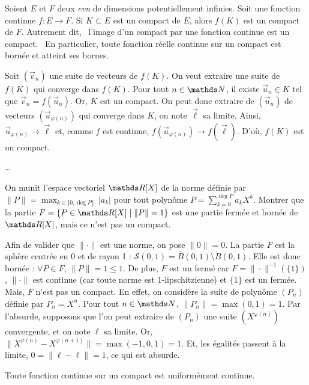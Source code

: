 

\begin{prop}
	Soient $E$ et $F$ deux \textit{evn} de dimensions potentiellement infinies.
	Soit une fonction continue $f : E \to F$. Si $K \subset E$ est un compact de $E$, alors $f(K)$ est un compact de $F$.
	Autrement dit, \guillemotleft~l'image d'un compact par une fonction continue est un compact.~\guillemotright\@
	En particulier, toute fonction réelle continue sur un compact est bornée et atteint ses bornes.
\end{prop}

\begin{prv}
	Soit $(\vec{v}_n)$ une suite de vecteurs de $f(K)$.
	On veut extraire une suite de $f(K)$ qui converge dans $f(K)$.
	Pour tout $n \in \N$, il existe $\vec{u}_n \in K$ tel que $\vec{v}_n = f(\vec{u}_n)$.
	Or, $K$ est un compact.
	On peut donc extraire de $(\vec{u}_n)$ de vecteurs $(\vec{u}_{\varphi(n)})$ qui converge dans $K$, on note $\vec{\ell}$ sa limite.
	Ainsi, $\vec{u}_{\varphi(n)} \to \vec{\ell}$ et, comme $f$ est continue, $f(\vec{u}_{\varphi(n)}) \to f(\vec{\ell})$. D'où, $f(K)$ est un compact.
\end{prv}


\begin{prop}
	\ldots
\end{prop}

\begin{exo}
	\begin{slshape}
		On munit l'espace vectoriel $\R[X]$ de la norme définie par $\|P\| = \max_{k \in \llbracket 0,\deg P \rrbracket}\:|a_k|$\/ pour tout polynôme $P = \sum_{k=0}^{\deg P} a_k X^k$. Montrer que la partie $F = \{P \in \R[X]  \mid \|P\| = 1\}$ est une partie fermée et bornée de $\R[X]$, mais ce n'est pas un compact.
	\end{slshape}

	Afin de valider que $\|\cdot\|$ est une norme, on pose $\|0\| = 0$.
	La partie $F$ est la sphère centrée en $0$ et de rayon 1 : $\mathcal{S}(0, 1) = \bar{B}(0, 1) \setminus \mathring B(0, 1)$.
	Elle est donc bornée : $\forall P \in F$, $\|P\| = 1 \le 1$.
	De plus, $F$ est un fermé car $F = \|\cdot \|^{-1}(\{1\})$, $\|\cdot\|$ est continue (car toute norme est 1-lipschitzienne) et $\{1\}$ est un fermée.
	Mais, $F$ n'est pas un compact. En effet, on considère la suite de polynôme $(P_n)$ définie par $P_n = X^n$.
	Pour tout $n \in \N$, $\|P_n\| = \max(0,1) = 1$.
	Par l'absurde, supposons que l'on peut extraire de $(P_n)$ une suite $(X^{\varphi(n)})$ convergente, et on note $\ell$ sa limite.
	Or, $\|X^{\varphi(n)} - X^{\varphi(n +1)}\| = \max(-1, 0, 1) = 1$.
	Et, les égalités passent à la limite, $0 = \|\ell - \ell\| = 1$, ce qui est absurde.
\end{exo}

\begin{thm}[Heine]
	Toute fonction continue sur un compact est uniformément continue.
\end{thm}

